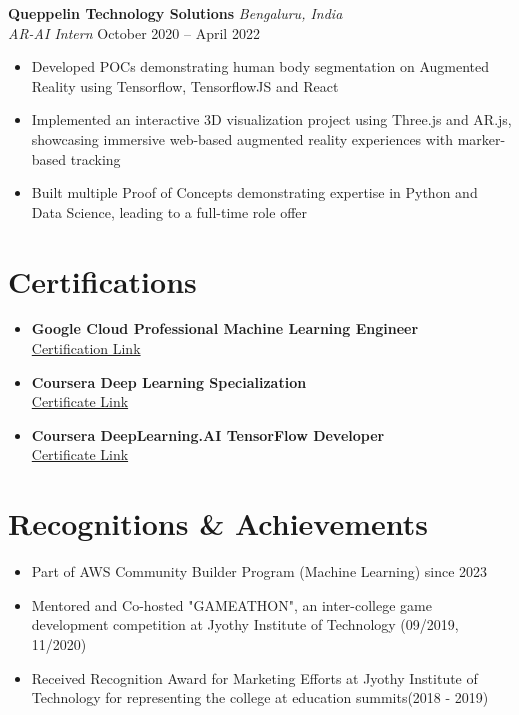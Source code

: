 \documentclass[11pt,a4paper]{article}
\begin{document}
\vspace{0.5em}
\noindent\textbf{Queppelin Technology Solutions} \hfill \textit{Bengaluru, India}\\
\textit{AR-AI Intern} \hfill October 2020 – April 2022
\begin{itemize}[noitemsep,topsep=2pt]
    \item Developed POCs demonstrating human body segmentation on Augmented Reality using Tensorflow, TensorflowJS and React
    \item Implemented an interactive 3D visualization project using Three.js and AR.js, showcasing immersive web-based augmented reality experiences with marker-based tracking
    \item Built multiple Proof of Concepts demonstrating expertise in Python and Data Science, leading to a full-time role offer
\end{itemize}
\vspace{-0.5em}

\section*{Certifications}
\begin{itemize}[noitemsep,topsep=2pt]
    \item \textbf{Google Cloud Professional Machine Learning Engineer} \\
    \href{https://google.accredible.com/2d680a48-ff8a-42b7-a018-4f63c9b77030}{Certification Link}
    \item \textbf{Coursera Deep Learning Specialization} \\
    \href{https://www.coursera.org/account/accomplishments/specialization/certificate/VU7R5F8YXV3K}{Certificate Link}
    \item \textbf{Coursera DeepLearning.AI TensorFlow Developer} \\
    \href{https://www.coursera.org/account/accomplishments/specialization/certificate/XEV648B4FRQ3}{Certificate Link}
\end{itemize}
\vspace{-0.5em}

\section*{Recognitions \& Achievements}
\begin{itemize}[noitemsep,topsep=2pt]
    \item Part of AWS Community Builder Program (Machine Learning) since 2023
    \item Mentored and Co-hosted "GAMEATHON", an inter-college game development competition at Jyothy Institute of Technology (09/2019, 11/2020)
    \item Received Recognition Award for Marketing Efforts at Jyothy Institute of Technology for representing the college at education summits(2018 - 2019)
\end{itemize}
\end{document}
